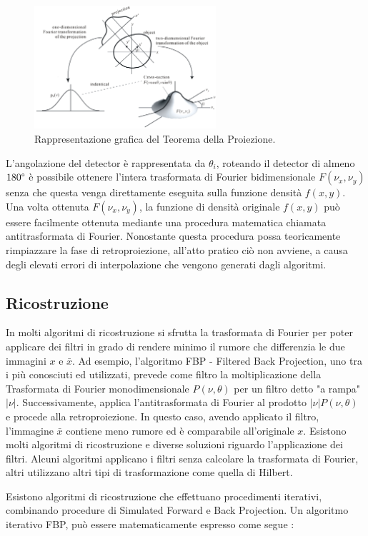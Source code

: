 \documentclass[a4paper,12pt, doubleside]{report}
\begin{document}
                    \begin{figure}[h]
                        \centering
                        \includegraphics[width=0.6\textwidth]{fourier}
                        \caption{Rappresentazione grafica del Teorema della Proiezione.}
                        \label{fig:slice-theorem}        
                    \end{figure}    
            
                \par
                    L'angolazione del detector è rappresentata da $\theta_i$, roteando il detector di almeno $180\degree$ è possibile ottenere l'intera trasformata di Fourier bidimensionale $F(\nu_x,\nu_y)$ senza che questa venga direttamente eseguita sulla funzione densità $f(x,y)$.
                    Una volta ottenuta $F(\nu_x,\nu_y)$, la funzione di densità originale $f(x,y)$ può essere facilmente ottenuta mediante una procedura matematica chiamata antitrasformata di Fourier. Nonostante questa procedura possa teoricamente rimpiazzare la fase di retroproiezione, all'atto pratico ciò non avviene, a causa degli elevati errori di interpolazione che vengono generati dagli algoritmi.
            
            \subsection{Ricostruzione}
                \par
                    In molti algoritmi di ricostruzione si sfrutta la trasformata di Fourier per poter applicare dei filtri in grado di rendere minimo il rumore che differenzia le due immagini $x$ e $\bar{x}$. Ad esempio, l'algoritmo FBP - Filtered Back Projection, uno tra i più conosciuti ed utilizzati, prevede come filtro la moltiplicazione della Trasformata di Fourier monodimensionale $P(\nu,\theta)$ per un filtro detto "a rampa" $|\nu|$. Successivamente, applica l'antitrasformata di Fourier al prodotto $|\nu|P(\nu, \theta)$ e procede alla retroproiezione. In questo caso, avendo applicato il filtro, l'immagine $\bar{x}$ contiene meno rumore ed è comparabile all'originale $x$. Esistono molti algoritmi di ricostruzione e diverse soluzioni riguardo l'applicazione dei filtri. Alcuni algoritmi applicano i filtri senza calcolare la trasformata di Fourier, altri utilizzano altri tipi di trasformazione come quella di Hilbert. 
                \bigskip
                \par
                    Esistono algoritmi di ricostruzione che effettuano procedimenti iterativi, combinando procedure di Simulated Forward e Back Projection. Un algoritmo iterativo FBP, può essere matematicamente espresso come segue \cite{fessler}:
                   
\end{document}
